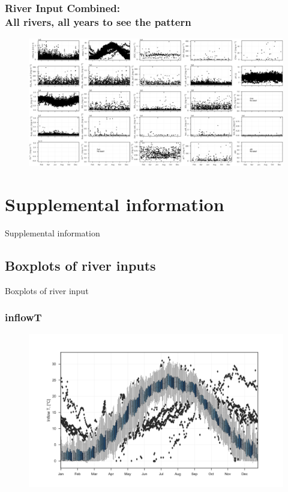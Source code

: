 \documentclass{beamer}
\begin{document}
\begin{frame}
\frametitle{River Input Combined: \\ All rivers, all years to see the pattern}
\begin{figure}
\includegraphics[width=\textwidth]{rivers/all/1yr_graph all_rivers_subplots.png}
\end{figure}
\end{frame}


\section{Supplemental information}

\begin{frame}
\begin{center}
\Huge Supplemental information
\end{center}
\end{frame}


\subsection{Boxplots of river inputs}

\begin{frame}
\begin{center}
\Huge Boxplots of river input
\end{center}
\end{frame}


\begin{frame}
\frametitle{inflowT}
\begin{figure}
\includegraphics[width=\textwidth]{rivers/all/1yr_boxpl/inflowT.png}
\end{figure}
\end{frame}
\end{document}
